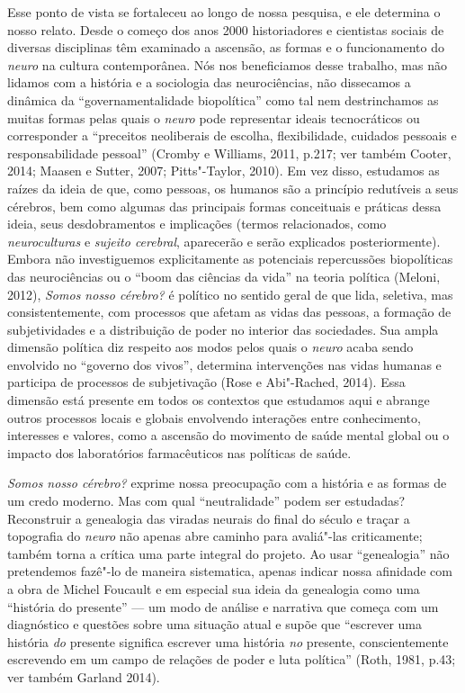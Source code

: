 Esse ponto de vista se fortaleceu ao longo de nossa pesquisa, e ele
determina o nosso relato. Desde o começo dos anos 2000 historiadores e
cientistas sociais de diversas disciplinas têm examinado a ascensão, as
formas e o funcionamento do \emph{neuro} na cultura contemporânea. Nós
nos beneficiamos desse trabalho, mas não lidamos com a história e a
sociologia das neurociências, não dissecamos a dinâmica da
``governamentalidade biopolítica'' como tal nem destrinchamos as muitas
formas pelas quais o \emph{neuro} pode representar ideais tecnocráticos
ou corresponder a ``preceitos neoliberais de escolha, flexibilidade,
cuidados pessoais e responsabilidade pessoal'' (Cromby e Williams, 2011,
p.217; ver também Cooter, 2014; Maasen e Sutter, 2007; Pitts"-Taylor,
2010). Em vez disso, estudamos as raízes da ideia de que, como pessoas,
os humanos são a princípio redutíveis a seus cérebros, bem como algumas
das principais formas conceituais e práticas dessa ideia, seus
desdobramentos e implicações (termos relacionados, como
\emph{neuroculturas} e \emph{sujeito cerebral}, aparecerão e serão
explicados posteriormente). Embora não investiguemos explicitamente as
potenciais repercussões biopolíticas das neurociências ou o ``boom das
ciências da vida'' na teoria política (Meloni, 2012), \emph{Somos nosso
cérebro?} é político no sentido geral de que lida, seletiva, mas
consistentemente, com processos que afetam as vidas das pessoas, a
formação de subjetividades e a distribuição de poder no interior das
sociedades. Sua ampla dimensão política diz respeito aos modos pelos
quais o \emph{neuro} acaba sendo envolvido no ``governo dos vivos'',
determina intervenções nas vidas humanas e participa de processos de
subjetivação (Rose e Abi"-Rached, 2014). Essa dimensão está presente em
todos os contextos que estudamos aqui e abrange outros processos locais
e globais envolvendo interações entre conhecimento, interesses e
valores, como a ascensão do movimento de saúde mental global ou o
impacto dos laboratórios farmacêuticos nas políticas de saúde.

\emph{Somos nosso cérebro?} exprime nossa preocupação com a história e
as formas de um credo moderno. Mas com qual ``neutralidade'' podem ser
estudadas? Reconstruir a genealogia das viradas neurais do final do
século  e traçar a topografia do \emph{neuro} não apenas abre caminho
para avaliá"-las criticamente; também torna a crítica uma parte integral
do projeto. Ao usar ``genealogia'' não pretendemos fazê"-lo de maneira
sistematica, apenas indicar nossa afinidade com a obra de Michel
Foucault e em especial sua ideia da genealogia como uma ``história do
presente'' --- um modo de análise e narrativa que começa com um
diagnóstico e questões sobre uma situação atual e supõe que ``escrever
uma história \emph{do} presente significa escrever uma história
\emph{no} presente, conscientemente escrevendo em um campo de relações
de poder e luta política'' (Roth, 1981, p.43; ver também Garland 2014).


